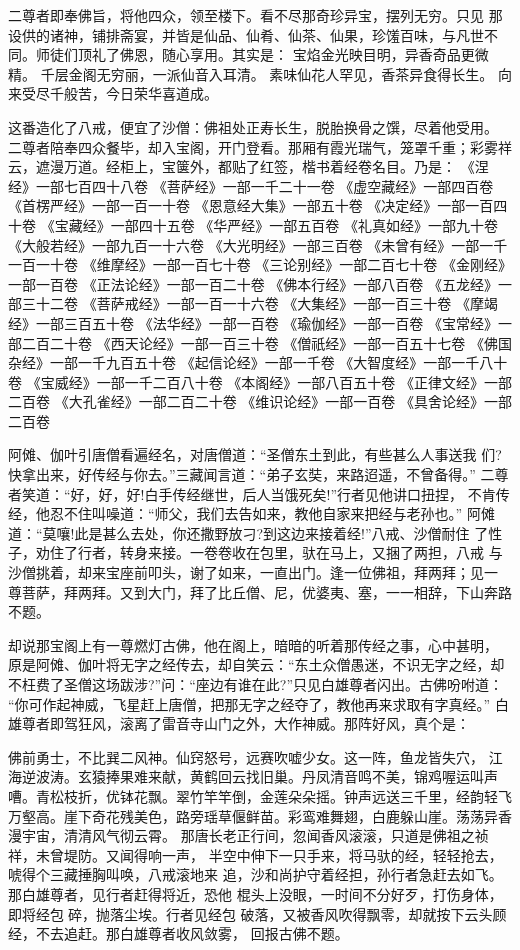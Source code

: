 二尊者即奉佛旨，将他四众，领至楼下。看不尽那奇珍异宝，摆列无穷。只见
那设供的诸神，铺排斋宴，并皆是仙品、仙肴、仙茶、仙果，珍馐百味，与凡世不
同。师徒们顶礼了佛恩，随心享用。其实是：
宝焰金光映目明，异香奇品更微精。
千层金阁无穷丽，一派仙音入耳清。
素味仙花人罕见，香茶异食得长生。
向来受尽千般苦，今日荣华喜道成。

这番造化了八戒，便宜了沙僧：佛祖处正寿长生，脱胎换骨之馔，尽着他受用。
二尊者陪奉四众餐毕，却入宝阁，开门登看。那厢有霞光瑞气，笼罩千重；彩雾祥
云，遮漫万道。经柜上，宝箧外，都贴了红签，楷书着经卷名目。乃是：
《涅经》一部七百四十八卷
《菩萨经》一部一千二十一卷
《虚空藏经》一部四百卷
《首楞严经》一部一百一十卷
《恩意经大集》一部五十卷
《决定经》一部一百四十卷
《宝藏经》一部四十五卷
《华严经》一部五百卷
《礼真如经》一部九十卷
《大般若经》一部九百一十六卷
《大光明经》一部三百卷
《未曾有经》一部一千一百一十卷
《维摩经》一部一百七十卷
《三论别经》一部二百七十卷
《金刚经》一部一百卷
《正法论经》一部一百二十卷
《佛本行经》一部八百卷
《五龙经》一部三十二卷
《菩萨戒经》一部一百一十六卷
《大集经》一部一百三十卷
《摩竭经》一部三百五十卷
《法华经》一部一百卷
《瑜伽经》一部一百卷
《宝常经》一部二百二十卷
《西天论经》一部一百三十卷
《僧祇经》一部一百五十七卷
《佛国杂经》一部一千九百五十卷
《起信论经》一部一千卷
《大智度经》一部一千八十卷
《宝威经》一部一千二百八十卷
《本阁经》一部八百五十卷
《正律文经》一部二百卷
《大孔雀经》一部二百二十卷
《维识论经》一部一百卷
《具舍论经》一部二百卷

阿傩、伽叶引唐僧看遍经名，对唐僧道：“圣僧东土到此，有些甚么人事送我
们?快拿出来，好传经与你去。”三藏闻言道：“弟子玄奘，来路迢遥，不曾备得。”
二尊者笑道：“好，好，好!白手传经继世，后人当饿死矣!”行者见他讲口扭捏，
不肯传经，他忍不住叫噪道：“师父，我们去告如来，教他自家来把经与老孙也。”
阿傩道：“莫嚷!此是甚么去处，你还撒野放刁?到这边来接着经!”八戒、沙僧耐住
了性子，劝住了行者，转身来接。一卷卷收在包里，驮在马上，又捆了两担，八戒
与沙僧挑着，却来宝座前叩头，谢了如来，一直出门。逢一位佛祖，拜两拜；见一
尊菩萨，拜两拜。又到大门，拜了比丘僧、尼，优婆夷、塞，一一相辞，下山奔路
不题。

却说那宝阁上有一尊燃灯古佛，他在阁上，暗暗的听着那传经之事，心中甚明，
原是阿傩、伽叶将无字之经传去，却自笑云：“东土众僧愚迷，不识无字之经，却
不枉费了圣僧这场跋涉?”问：“座边有谁在此?”只见白雄尊者闪出。古佛吩咐道：
“你可作起神威，飞星赶上唐僧，把那无字之经夺了，教他再来求取有字真经。”
白雄尊者即驾狂风，滚离了雷音寺山门之外，大作神威。那阵好风，真个是：

佛前勇士，不比巽二风神。仙窍怒号，远赛吹嘘少女。这一阵，鱼龙皆失穴，
江海逆波涛。玄猿捧果难来献，黄鹤回云找旧巢。丹凤清音鸣不美，锦鸡喔运叫声
嘈。青松枝折，优钵花飘。翠竹竿竿倒，金莲朵朵摇。钟声远送三千里，经韵轻飞
万壑高。崖下奇花残美色，路旁瑶草偃鲜苗。彩鸾难舞翅，白鹿躲山崖。荡荡异香
漫宇宙，清清风气彻云霄。
那唐长老正行间，忽闻香风滚滚，只道是佛祖之祯祥，未曾堤防。又闻得响一声，
半空中伸下一只手来，将马驮的经，轻轻抢去，唬得个三藏捶胸叫唤，八戒滚地来
追，沙和尚护守着经担，孙行者急赶去如飞。那白雄尊者，见行者赶得将近，恐他
棍头上没眼，一时间不分好歹，打伤身体，即将经包碎，抛落尘埃。行者见经包
破落，又被香风吹得飘零，却就按下云头顾经，不去追赶。那白雄尊者收风敛雾，
回报古佛不题。

